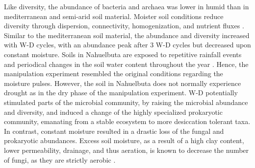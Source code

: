 Like diversity, the abundance of bacteria and archaea was lower in humid than in mediterranean and semi-arid soil material. Moister soil conditions reduce diversity through dispersion, connectivity, homogenization, and nutrient fluxes \citep{StovicekA2017}. Similar to the mediterranean soil material, the abundance and diversity increased with W-D cycles, with an abundance peak after 3 W-D cycles but decreased upon constant moisture. Soils in Nahuelbuta are exposed to repetitive rainfall events and periodical changes in the soil water content throughout the year \citep{Uebernickel2020}. Hence, the manipulation experiment resembled the original conditions regarding the moisture pulses. However, the soil in Nahuelbuta does not normally experience drought as in the dry phase of the manipulation experiment. W-D potentially stimulated parts of the microbial community, by raising the microbial abundance and diversity, and induced a change of the highly specialized prokaryotic community, emanating from a stable ecosystem \citep{Rodriguez2022} to more desiccation tolerant taxa. In contrast, constant moisture resulted in a drastic loss of the fungal and prokaryotic abundances. Excess soil moisture, as a result of a high clay content, lower permeability, drainage, and thus aeration, is known to decrease the number of fungi, as they are strictly aerobic \citep{Chotte2005}.

